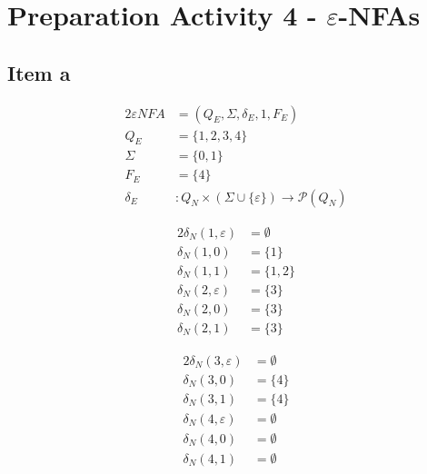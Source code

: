 \documentclass[docid=PA04]{tcom_PA}
\begin{document}
\setcounter{section}{3}
\section{Preparation Activity 4 - \texorpdfstring{$\varepsilon$}{epsilon}-NFAs}
{
\renewcommand{\thesubsection}{\thesection.\alph{subsection}}
\subsection{Item a}
\begin{center}
\begin{minipage}[c]{0.35\textwidth}
	\begin{alignat*}{2}
		\varepsilon NFA    &= (Q_E, \Sigma, \delta_E, 1, F_E)\\
		Q_E    &= \{1,2,3,4\}\\
		\Sigma &= \{0,1\}\\
		F_E    &= \{4\}\\
		\delta_E &\colon Q_N \times (\Sigma\cup \{\varepsilon\}) \rightarrow \mathscr{P}(Q_N)
	\end{alignat*}
\end{minipage}%
\begin{minipage}[c]{0.25\textwidth}
	\begin{alignat*}{2}
		\delta_N(1,\varepsilon) &= \emptyset\\
		\delta_N(1,          0) &= \{1\}\\
		\delta_N(1,          1) &= \{1,2\}\\
		\delta_N(2,\varepsilon) &= \{3\}\\
		\delta_N(2,          0) &= \{3\}\\
		\delta_N(2,          1) &= \{3\}
	\end{alignat*}
\end{minipage}%
\begin{minipage}[c]{0.25\textwidth}
	\begin{alignat*}{2}
		\delta_N(3,\varepsilon) &= \emptyset\\
		\delta_N(3,          0) &= \{4\}\\
		\delta_N(3,          1) &= \{4\}\\
		\delta_N(4,\varepsilon) &= \emptyset\\
		\delta_N(4,          0) &= \emptyset\\
		\delta_N(4,          1) &= \emptyset
	\end{alignat*}
\end{minipage}
\end{center}
}
\end{document}
